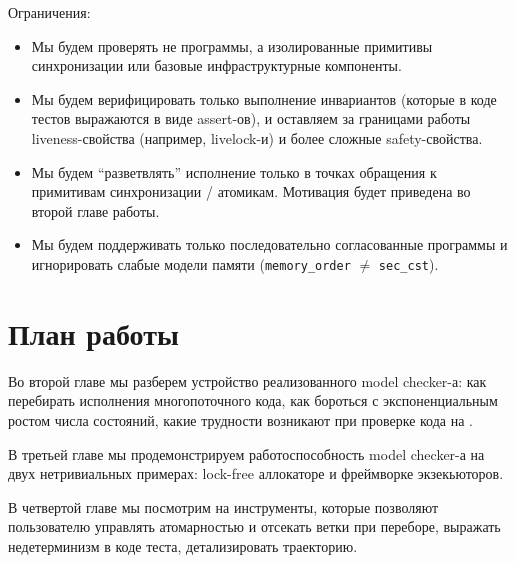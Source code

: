 Ограничения:

\begin{itemize}
\item	Мы будем проверять не программы, а изолированные примитивы синхронизации или базовые инфраструктурные компоненты.

\item	Мы будем верифицировать только выполнение инвариантов (которые в коде тестов выражаются в виде assert-ов), и оставляем за границами работы liveness-свойства (например, livelock-и) и более сложные safety-свойства.

\item	Мы будем “разветвлять” исполнение только в точках обращения к примитивам синхронизации / атомикам. Мотивация будет приведена во второй главе работы. 

\item	Мы будем поддерживать только последовательно согласованные программы и игнорировать слабые модели памяти (\texttt{memory_order} $\ne$ \texttt{sec_cst}).
\end{itemize}


\section{План работы}

Во второй главе мы разберем устройство реализованного model checker-а: как перебирать исполнения многопоточного кода, как бороться с экспоненциальным ростом числа состояний, какие трудности возникают при проверке кода на \CC. 

В третьей главе мы продемонстрируем работоспособность model checker-а на двух нетривиальных примерах: lock-free аллокаторе и фреймворке экзекьюторов.

В четвертой главе мы посмотрим на инструменты, которые позволяют пользователю управлять атомарностью и отсекать ветки при переборе, выражать недетерминизм в коде теста, детализировать траекторию. 


